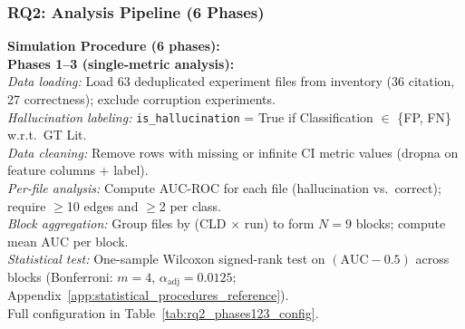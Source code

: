 \subsubsection{RQ2: Analysis Pipeline (6 Phases)}
\label{sec:rq2_analysis}

\noindent\textbf{Simulation Procedure (6 phases):}\\
\textbf{Phases 1--3 (single-metric analysis):}\\
\textit{Data loading:} Load 63 deduplicated experiment files from inventory (36 citation, 27 correctness); exclude corruption experiments.\\
\textit{Hallucination labeling:} \texttt{is\_hallucination} = True if Classification $\in$ \{FP, FN\} w.r.t.\ GT Lit.\\
\textit{Data cleaning:} Remove rows with missing or infinite CI metric values (dropna on feature columns + label).\\
\textit{Per-file analysis:} Compute AUC-ROC for each file (hallucination vs.\ correct); require $\geq$10 edges and $\geq$2 per class.\\
\textit{Block aggregation:} Group files by (CLD $\times$ run) to form $N{=}9$ blocks; compute mean AUC per block.\\
\textit{Statistical test:} One-sample Wilcoxon signed-rank test on $(\mathrm{AUC}-0.5)$ across blocks (Bonferroni: $m{=}4$, $\alpha_{\text{adj}}{=}0.0125$; Appendix~\ref{app:statistical_procedures_reference}).\\
Full configuration in Table~\ref{tab:rq2_phases123_config}.

